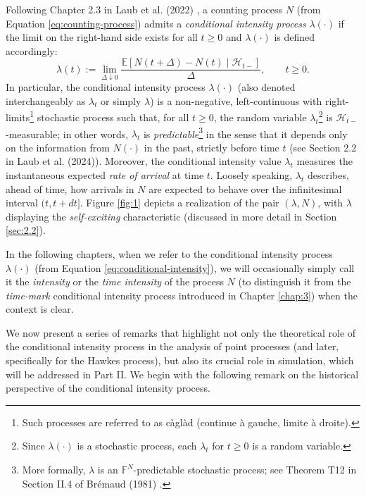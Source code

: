 \documentclass[12pt,a4paper]{report}
\theoremstyle{plain}
\theoremstyle{definition}
\theoremstyle{remark}
\newcommand{\1}{\mathbf{1}}
\begin{document}
\medskip
\noindent
Following Chapter 2.3 in Laub et al. (2022) \cite{LLT22}, a counting process $N$ (from Equation \eqref{eq:counting-process}) admits a \emph{conditional intensity process} $\lambda(\cdot)$ if the limit on the right-hand side exists for all $t\ge0$ and $\lambda(\cdot)$ is defined accordingly:
\begin{equation}\label{eq:conditional-intensity}
\lambda(t) := \lim_{\Delta \downarrow 0} \frac{\mathbb{E}\!\left[ N(t+\Delta) - N(t) \mid \mathcal{H}_{t-} \right]}{\Delta}, \qquad t \ge 0.
\end{equation}
In particular, the conditional intensity process $\lambda(\cdot)$ (also denoted interchangeably as $\lambda_t$ or simply $\lambda$) is a non-negative, left-continuous with right-limits\footnote{Such processes are referred to as c\`agl\`ad (continue à gauche, limite à droite).} stochastic process such that, for all $t\ge0$, the random variable $\lambda_t$\footnote{Since $\lambda(\cdot)$ is a stochastic process, each $\lambda_t$ for $t\ge0$ is a random variable.} is $\mathcal{H}_{t-}$-measurable; in other words, $\lambda_t$ is \emph{predictable}\footnote{More formally, $\lambda$ is an $\mathbb{F}^N$-predictable stochastic process; see Theorem T12 in Section II.4 of Br\'emaud (1981) \cite{Bre81}.} in the sense that it depends only on the information from $N(\cdot)$ in the past, strictly before time $t$ (see Section 2.2 in Laub et al. (2024)\cite{LLPT24}). Moreover, the conditional intensity value $\lambda_t$ measures the instantaneous expected \emph{rate of arrival} at time $t$. Loosely speaking, $\lambda_t$ describes, ahead of time, how arrivals in $N$ are expected to behave over the infinitesimal interval $(t, t+dt]$. Figure \ref{fig:1} depicts a realization of the pair $(\lambda, N)$, with $\lambda$ displaying the \emph{self-exciting} characteristic (discussed in more detail in Section \ref{sec:2.2}).

\medskip
\noindent
In the following chapters, when we refer to the conditional intensity process $\lambda(\cdot)$ (from Equation \eqref{eq:conditional-intensity}), we will occasionally simply call it the \emph{intensity} or the \emph{time intensity} of the process $N$ (to distinguish it from the \emph{time-mark} conditional intensity process introduced in Chapter \ref{chap:3}) when the context is clear.

\medskip
\noindent
We now present a series of remarks that highlight not only the theoretical role of the conditional intensity process in the analysis of point processes (and later, specifically for the Hawkes process), but also its crucial role in simulation, which will be addressed in Part II. We begin with the following remark on the historical perspective of the conditional intensity process.
\end{document}
